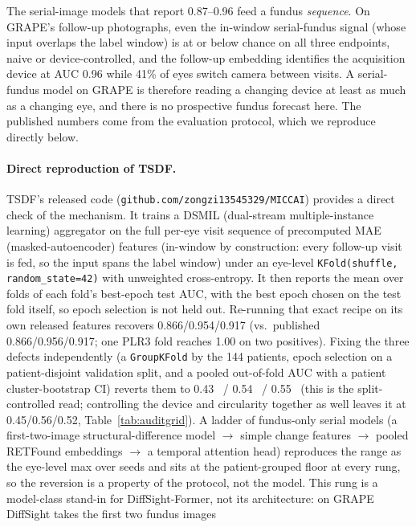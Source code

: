 The serial-image models that report \num{0.87}--\num{0.96} feed a fundus \emph{sequence}. On GRAPE's follow-up
photographs, even the in-window serial-fundus signal (whose input overlaps the label window) is at or below chance on all
three endpoints, naive or device-controlled, and the follow-up embedding identifies the acquisition device at AUC
\num{0.96} while 41\% of eyes switch camera between visits. A serial-fundus model on GRAPE is therefore reading a changing
device at least as much as a changing eye, and there is no prospective fundus forecast here. The published numbers come
from the evaluation protocol, which we reproduce directly below.

\paragraph{Direct reproduction of TSDF.} TSDF's released code (\texttt{github.com/zongzi13545329/MICCAI}) provides a direct
check of the mechanism. It trains a DSMIL (dual-stream multiple-instance learning) aggregator on the full per-eye visit sequence of precomputed
MAE (masked-autoencoder) features (in-window by construction: every follow-up visit is fed, so the input spans the label
window) under an eye-level
\texttt{KFold(shuffle, random\_state{=}42)} with unweighted
cross-entropy. It then reports the mean over folds of each fold's best-epoch test AUC, with the best epoch chosen on the
test fold itself, so epoch selection is not held out. Re-running that exact recipe on its own released features recovers \num{0.866}/\num{0.954}/\num{0.917}
(vs.\ published \num{0.866}/\num{0.956}/\num{0.917}; one PLR3 fold reaches \num{1.00} on two positives). Fixing the three
defects independently (a \texttt{GroupKFold} by the 144 patients, epoch selection on a patient-disjoint validation
split, and a pooled out-of-fold AUC with a patient cluster-bootstrap CI) reverts them to \num{0.43}~ /
\num{0.54}~ / \num{0.55}~ (this is the split-controlled read; controlling the device and
circularity together as well leaves it at \num{0.45}/\num{0.56}/\num{0.52}, Table~\ref{tab:auditgrid}). A ladder of fundus-only serial models (a first-two-image
structural-difference model $\rightarrow$ simple change features $\rightarrow$ pooled RETFound embeddings $\rightarrow$
a temporal attention head) reproduces the range as the eye-level max over seeds and sits at the patient-grouped floor at
every rung, so the reversion is a property of the protocol, not the model. This rung is a
model-class stand-in for DiffSight-Former, not its architecture: on GRAPE DiffSight takes the first two fundus images
